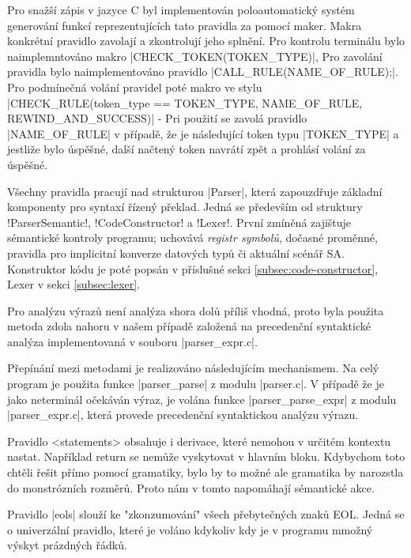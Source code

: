 Pro snažší zápis v jazyce C byl implementován poloautomatický systém generování funkcí reprezentujících tato pravidla za pomocí maker.
Makra konkrétní pravidlo zavolají a zkontrolují jeho splnění. Pro kontrolu terminálu bylo naimplemntováno makro
\ic|CHECK_TOKEN(TOKEN_TYPE)|,
Pro zavolání pravidla bylo naimplementováno pravidlo \ic|CALL_RULE(NAME_OF_RULE);|.
Pro podmínečná volání pravidel poté makro ve stylu
\ic|CHECK_RULE(token_type == TOKEN_TYPE, NAME_OF_RULE, REWIND_AND_SUCCESS)| - Pri použití se zavolá pravidlo
\ic|NAME_OF_RULE| v případě, že je následující token typu \ic|TOKEN_TYPE| a jestliže bylo úspěšné, další načtený
token navrátí zpět a prohlásí volání za úspěšné.

Všechny pravidla pracují nad strukturou \ic|Parser|, která zapouzdřuje základní komponenty pro syntaxí řízený překlad.
Jedná se především od struktury \ic!ParserSemantic!, \ic!CodeConstructor! a \ic!Lexer!. První zmíněná zajištuje sémantické
kontroly programu; uchovává \emph{registr symbolů}, dočasné proměnné, pravidla pro implicitní konverze datových typů či
aktuální scénář SA. Konstruktor kódu je poté popsán v příslušné sekci \ref{subsec:code-constructor}, Lexer v sekci
\ref{subsec:lexer}.

Pro analýzu výrazů není analýza shora dolů příliš vhodná, proto byla
použita metoda zdola nahoru v našem případě založená na precedenční
syntaktické analýza implementovaná v souboru \ic|parser_expr.c|.

Přepínání mezi metodami je realizováno následujícím mechanismem. Na celý program je použita funkce \ic|parser_parse|
z modulu \ic|parser.c|. V případě že je jako neterminál očekáván výraz, je volána funkce \ic|parser_parse_expr|
z modulu \ic|parser_expr.c|, která provede precedenční syntaktickou analýzu výrazu.

Pravidlo <statements> obsahuje i derivace, které nemohou v určitém kontextu nastat.
Například return se nemůže vyskytovat v hlavním bloku. Kdybychom toto chtěli řešit
přímo pomocí gramatiky, bylo by to možné ale gramatika by narozstla do monstrózních rozměrů.
Proto nám v tomto napomáhají sémantické akce.

Pravidlo \ic|eols| slouží ke "zkonzumování" všech přebytečných znaků EOL.
Jedná se o univerzální pravidlo, které je voláno kdykoliv kdy je v programu
mmožný výskyt prázdných řádků.

